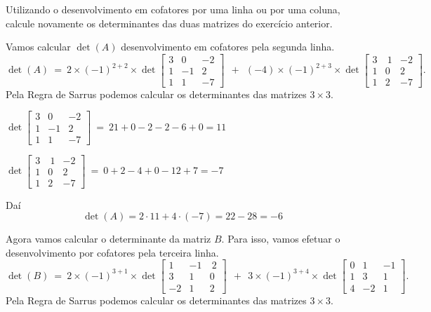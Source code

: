 \begin{problem}
Utilizando o desenvolvimento em cofatores por uma linha ou por uma coluna, calcule novamente os determinantes das duas matrizes do exercício anterior.
\end{problem}
\begin{solution}
Vamos calcular $\det(A)$ desenvolvimento em cofatores pela segunda linha.
$$\det(A)\ =\ 
2 \times (-1)^{2+2} \times \det \left[ \begin{array}{rrr}
 3 &  0 & -2 \\
 1 & -1 &  2 \\  
 1 &  1 & -7
\end{array} \right]\  \ + \ \ 
(-4) \times (-1)^{2+3} \times \det \left[ \begin{array}{rrr}
 3 & \ 1 & -2 \\
 1 &   0 &  2 \\  
 1 &   2 & -7
\end{array} \right] .$$
Pela Regra de Sarrus podemos calcular os determinantes das matrizes $3 \times 3$.

\medskip
\hspace{3cm}$\det \left[ \begin{array}{rrr}
 3 &  0 & -2 \\
 1 & -1 &  2 \\  
 1 &  1 & -7
\end{array} \right]\ =\ 21 + 0 - 2 - 2 - 6 + 0 = 11$

\medskip
\hspace{3cm}$\det \left[ \begin{array}{rrr}
 3 & \ 1 & -2 \\
 1 &   0 &  2 \\  
 1 &   2 & -7
\end{array} \right]\ =\ 0 + 2 - 4 + 0 - 12 + 7 = -7$

\medskip
Daí
$$\det(A) = 2 \cdot 11 + 4 \cdot (-7) = 22 - 28 = -6$$

\bigskip
Agora vamos calcular o determinante da matriz $B$. Para isso, vamos efetuar o \linebreak
desenvolvimento por cofatores pela terceira linha.
$$\det(B)\ =\ 
2 \times (-1)^{3+1} \times \det \left[ \begin{array}{rrr}
 1 & -1 & \  2 \\
 3 &  1 &  0 \\  
-2 &  1 &  2
\end{array} \right]\  \ + \ \ 
3 \times (-1)^{3+4} \times \det \left[ \begin{array}{rrr}
 0 &  1 & -1 \\
 1 &  3 &  1 \\  
 4 & -2 &  1
\end{array} \right] .$$
Pela Regra de Sarrus podemos calcular os determinantes das matrizes $3 \times 3$.


\end{solution}
